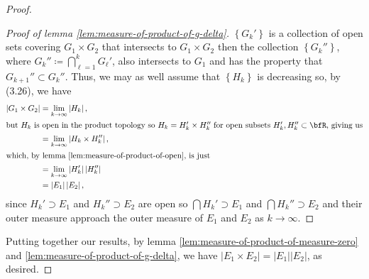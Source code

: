 \begin{proof}
\begin{proof}[Proof of lemma \ref{lem:measure-of-product-of-g-delta}]
$\left\{G_k'\right\}$ is a collection of open sets covering $G_1\times G_2$
that intersects to $G_1\times G_2$ then the collection
$\left\{G_k''\right\}$, where $G_k''\coloneqq\bigcap_{\ell=1}^k G_\ell'$,
also intersects to $G_1$ and has the property that $G_{k+1}''\subset
G_k''$. Thus, we may as well assume that $\left\{H_k\right\}$ is decreasing
so, by (3.26), we have
\begin{align*}
\left|G_1\times G_2\right|
&=\lim_{k\to\infty}\left|H_k\right|,\\
\intertext{but $H_k$ is open in the product topology so $H_k=H_k'\times
  H_k''$ for open subsets $H_k',H_k''\subset\bfR$, giving us}
&=\lim_{k\to\infty}\left|H_k\times H_k''\right|,\\
\intertext{which, by lemma \ref{lem:measure-of-product-of-open}, is just}
&=\lim_{k\to\infty}\left|H_k'\right|\left|H_k''\right|\\
&=\left|E_1\right|\left|E_2\right|,
\end{align*}
since $H_k'\supset E_1$ and $H_k''\supset E_2$ are open so $\bigcap
H_k'\supset E_1$ and $\bigcap H_k''\supset E_2$ and their outer measure
approach the outer measure of $E_1$ and $E_2$ as $k\to\infty$.
\end{proof}
Putting together our results, by lemma
\ref{lem:measure-of-product-of-measure-zero} and
\ref{lem:measure-of-product-of-g-delta}, we have $\left|E_1\times
  E_2\right|=\left|E_1\right|\left|E_2\right|$, as desired.
\end{proof}
\newpage

